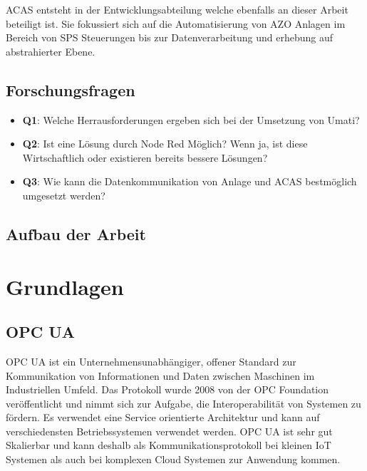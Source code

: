 \documentclass[a4paper, 12pt, oneside]{scrbook}
\begin{document}
	\noindent ACAS entsteht in der Entwicklungsabteilung welche ebenfalls an dieser Arbeit beteiligt ist. Sie fokussiert sich auf die Automatisierung von AZO Anlagen im Bereich von SPS Steuerungen bis zur Datenverarbeitung und erhebung auf abstrahierter Ebene. 
	
	
	\section{Forschungsfragen}
	
	\begin{itemize}
		\item \textbf{Q1}: Welche Herrausforderungen ergeben sich bei der Umsetzung von Umati?
		\item \textbf{Q2}: Ist eine Lösung durch Node Red Möglich? Wenn ja, ist diese Wirtschaftlich oder existieren bereits bessere Lösungen?
		\item \textbf{Q3}: Wie kann die Datenkommunikation von Anlage und ACAS bestmöglich umgesetzt werden?
	\end{itemize}
	
	\section{Aufbau der Arbeit}
	
	
\chapter{Grundlagen}
	
	\section{OPC UA}
	
	\noindent \ac{OPC UA} ist ein Unternehmensunabhängiger, offener Standard zur Kommunikation von Informationen und Daten zwischen Maschinen im Industriellen Umfeld. Das Protokoll wurde 2008 von der OPC Foundation veröffentlicht und nimmt sich zur Aufgabe, die Interoperabilität von Systemen zu fördern. Es verwendet eine Service orientierte Architektur und kann auf verschiedensten Betriebssystemen verwendet werden. OPC UA ist sehr gut Skalierbar und kann deshalb als Kommunikationsprotokoll bei kleinen \ac{IoT} Systemen als auch bei komplexen Cloud Systemen zur Anwendung kommen.
	
\end{document}
